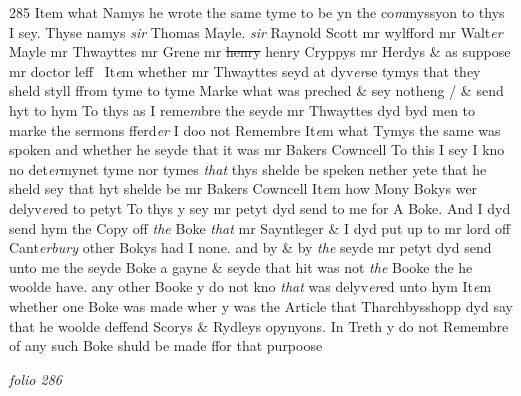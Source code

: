 \documentclass[12pt, a4paper]{book}
\begin{document}
{\color{Mahogany}285} 
				\marginpar[\vspace{0.5cm}{\textcolor{Gray}{11}}]{}
			 Item what Namys he wrote the same tyme to be yn the co\textit{m}myssyon to thys I sey. Thyse namys \textit{sir }Thomas Mayle. \textit{sir} Raynold Scott mr wylfford mr Walt\textit{er} Mayle mr Thwayttes mr Grene mr \sout{henry }henry Cryppys mr Herdys \& as suppose mr doctor leff    
				\marginpar[\vspace{0.5cm}{\textcolor{Gray}{18}}]{}
			 It\textit{e}m whether mr Thwayttes seyd at dyv\textit{er}se tymys that they sheld styll ffrom tyme to tyme Marke what was preched \& sey notheng / \& send hyt to hym To thys as I reme\textit{m}bre the seyde mr Thwayttes dyd byd men to marke the sermons fferd\textit{er} I doo not Remembre  
				\marginpar[\vspace{0.5cm}{\textcolor{Gray}{19}}]{}
			 It\textit{e}m what Tymys the same was spoken and whether he seyde that it was mr Bakers Cowncell To this I sey I kno no det\textit{er}mynet tyme nor tymes \textit{that} thys shelde be speken nether yete that he sheld sey that hyt shelde be mr Bakers Cowncell  
				\marginpar[\vspace{0.5cm}{\textcolor{Gray}{20}}]{}
			 It\textit{e}m how Mony Bokys wer delyv\textit{er}ed to petyt To thys y sey mr petyt dyd send to me for A Boke. And I dyd send hym the Copy off \textit{the} Boke \textit{that} mr Sayntleger \& I dyd put up to mr lord off Cant\textit{erbury} other Bokys had I none. and by \& by \textit{the} seyde mr petyt dyd send unto me the seyde Boke a gayne \& seyde that hit was not \textit{the} Booke the  he woolde have. any other Booke y do not kno \textit{that} was delyv\textit{er}ed unto hym  
				\marginpar[\vspace{0.5cm}{\textcolor{Gray}{21}}]{}
			 It\textit{e}m whether one Boke was made wher y was the Article that Tharchbysshopp dyd say that he woolde deffend Scorys \& Rydleys opynyons.  In Treth y do not Remembre of any such Boke shuld be made ffor that purpoose

\dotfill
					

\textit{folio 286}
\end{document}
